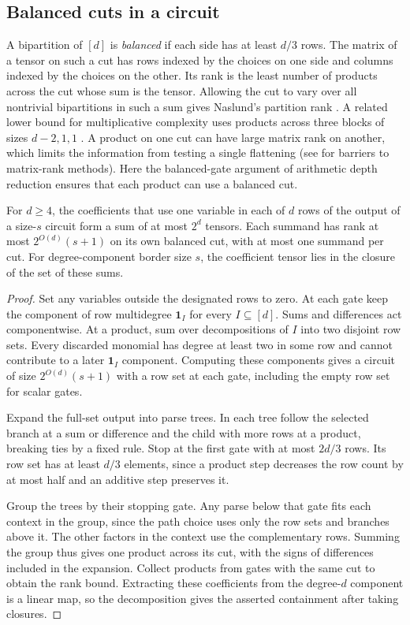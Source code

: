 \subsection{Balanced cuts in a circuit}

A bipartition of $[d]$ is \emph{balanced} if each side has at least
$d/3$ rows. The matrix of a tensor on such a cut has rows indexed by
the choices on one side and columns indexed by the choices on the
other. Its rank is the least number of products across the cut whose
sum is the tensor. Allowing the cut to vary over all nontrivial
bipartitions in such a sum gives Naslund's partition rank
\cite{Naslund}. A related lower bound for multiplicative complexity
uses products across three blocks of sizes $d-2,1,1$
\cite{BrandKaskiWang}. A product on one cut can have large matrix
rank on another, which limits the information from testing a single
flattening (see \cite{egow} for barriers to matrix-rank methods).
Here the balanced-gate argument of arithmetic depth reduction
\cite{VSBR} ensures that each product can use a balanced cut.

\begin{lemma}\label{lem:balanced}
For $d\ge4$, the coefficients that use one variable in each of $d$
rows of the output of a size-$s$ circuit form a sum of at most $2^d$
tensors. Each summand has rank at most $2^{O(d)}(s+1)$ on its own
balanced cut, with at most one summand per cut. For degree-component
border size $s$, the coefficient tensor lies in the closure of the
set of these sums.
\end{lemma}

\begin{proof}
Set any variables outside the designated rows to zero. At each gate
keep the component of row multidegree $\mathbf1_I$ for
every $I\subseteq[d]$. Sums and differences act componentwise. At a
product, sum over decompositions of $I$ into two disjoint row sets.
Every discarded monomial has degree at least two in some row and
cannot contribute to a later $\mathbf1_I$ component. Computing these
components gives a circuit of size $2^{O(d)}(s+1)$ with a
row set at each gate, including the empty row set for scalar gates.

Expand the full-set output into parse trees. In each tree follow the
selected branch at a sum or difference and the child with more rows
at a product, breaking ties by a fixed rule. Stop at the first gate
with at most $2d/3$ rows. Its row set has at least $d/3$ elements,
since a product step decreases the row count by at most half and an
additive step preserves it.

Group the trees by their stopping gate. Any parse below that gate
fits each context in the group, since the path choice uses only the
row sets and branches above it. The other factors in the context use
the complementary rows. Summing the group thus gives one product
across its cut, with the signs of differences included in the
expansion. Collect products from gates with the same cut to obtain
the rank bound. Extracting these coefficients from the degree-$d$
component is a linear map, so the decomposition gives the asserted
containment after taking closures.
\end{proof}

